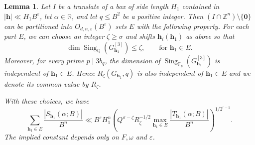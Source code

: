\documentclass[reqno,a4paper,11pt]{amsart}
\numberwithin{equation}{section}
\newcommand{\ZZ}{\mathbb Z}
\newcommand{\QQ}{\mathbb Q}
\newcommand{\RR}{\mathbb R}
\newcommand{\h}{\mathbf h}
\newcommand{\eps}{\varepsilon}
\theoremstyle{plain}
\newtheorem{lemma}[theorem]{Lemma}
\theoremstyle{definition}
\begin{document}
\begin{lemma}\label{lem:uniform-selection}
Let \(I\) be a translate of a box of side length \(H_1\) contained in \(|\h|\ll H_1B^\eps\), let \(\alpha\in\RR\), and let \(q\leq B^2\) be a positive integer.
Then \((I\cap\ZZ^n)\setminus\{\boldsymbol 0\}\) can be partitioned into \(O_{d,n,\eps}(B^\eps)\) sets \(E\) with the following property.
For each part \(E\), we can choose an integer \(\zeta\geq\sigma\) and shifts \(\h_i(\h_1)\) as above so that
\[
 \dim\operatorname{Sing}_{\QQ}(G_{\h_1}^{[3]})\leq\zeta,
 \qquad \text{for } \h_1\in E.
\]
Moreover, for every prime \(p\mid3b_q\), the dimension of \(\operatorname{Sing}_{\mathbb F_p}(G_{\h_1}^{[3]})\) is independent of \(\h_1\in E\).
Hence \(R_\zeta(G_{\h_1},q)\) is also independent of \(\h_1\in E\) and we denote its common value by \(R_\zeta\).

With these choices, we have
\begin{equation}\label{eq:uniform-family}
 \sum_{\h_1\in E}
 \frac{|S_{\h_1}(\alpha;B)|}{B^n}
 \ll B^\eps H_1^n
 \left(
 Q^{\sigma-\zeta}R_\zeta^{-1/2}
 \max_{\h_1\in E}
 \frac{|T_{\h_1}(\alpha;B)|}{B^n}
 \right)^{1/2^{r-1}}.
\end{equation}
The implied constant depends only on \(F,\omega\) and \(\eps\).
\end{lemma}
\end{document}
